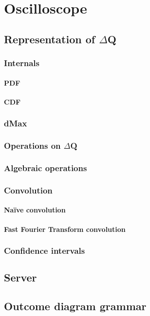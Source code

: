 \chapter{Oscilloscope}
    \section{Representation of $\Delta$Q}
        \subsection{Internals}
            \subsubsection{PDF}
            \subsubsection{CDF}
        \subsection{dMax}
    \subsection{Operations on $\Delta$Q}
        \subsection{Algebraic operations}
        \subsection{Convolution}
            \subsubsection{Naïve convolution}
            \subsubsection{Fast Fourier Transform convolution}
    \subsection{Confidence intervals}
    \section{Server}
     
    \section{Outcome diagram grammar}
